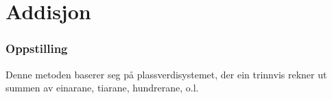 



\section{Addisjon}

\subsubsection{Oppstilling}
Denne metoden baserer seg på plassverdisystemet, der ein trinnvis rekner ut summen av einarane, tiarane, hundrerane, o.l.

\begin{center}
	\parbox{0.3\linewidth}{
}\qquad
\parbox{0.3\linewidth}{
}\\[12pt]
\parbox{0.3\linewidth}{
}\qquad
\parbox{0.3\linewidth}{
}
\end{center}
